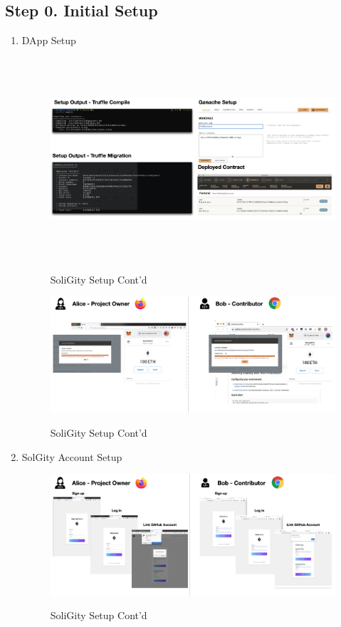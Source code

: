 \documentclass[12pt]{article}
\renewcommand{\_}{\kern-1.5pt\textunderscore\kern-1.5pt}
\begin{document}
\subsection*{Step 0. Initial Setup}
\begin{enumerate}
	\item DApp Setup
	      \begin{figure}[H]
		      \centering
		      \includegraphics[height=7.5cm]{graphs/47. setup_2.png}\\
		      \caption{SoliGity Setup Cont'd}
		      \label{fig:setup2}
	      \end{figure}

	      \begin{figure}[H]
		      \centering
		      \includegraphics[width=16.5cm]{graphs/48. setup_3.png}\\
		      \caption{SoliGity Setup Cont'd}
		      \label{fig:setup3}
	      \end{figure}

	\item SolGity Account Setup
	      \begin{figure}[H]
		      \centering
		      \includegraphics[width=16.5cm]{graphs/49. setup_4.png}\\
		      \caption{SoliGity Setup Cont'd}
		      \label{fig:setup4}
	      \end{figure}
\end{enumerate}
\end{document}
